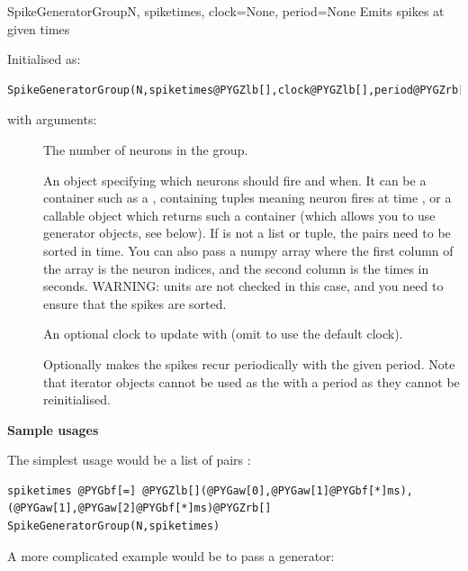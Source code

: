 \documentclass[letterpaper,10pt,english]{manual}
\begin{document}
\hypertarget{brian.SpikeGeneratorGroup}{}\begin{classdesc}{SpikeGeneratorGroup}{N, spiketimes, clock=None, period=None}
Emits spikes at given times

Initialised as:

\begin{Verbatim}[commandchars=@\[\]]
SpikeGeneratorGroup(N,spiketimes@PYGZlb[],clock@PYGZlb[],period@PYGZrb[]@PYGZrb[])
\end{Verbatim}

with arguments:
\begin{description}
\item[]
The number of neurons in the group.

\item[]
An object specifying which neurons should fire and when. It can be a container
such as a , containing tuples  meaning neuron  fires at
time , or a callable object which returns such a container (which
allows you to use generator objects, see below). If  is not
a list or tuple, the pairs  need to be sorted in time. You can
also pass a numpy array  where the first column of the
array is the neuron indices, and the second column is the times in
seconds. WARNING: units are not checked in this case, and you need to
ensure that the spikes are sorted.

\item[]
An optional clock to update with (omit to use the default clock).

\item[]
Optionally makes the spikes recur periodically with the given
period. Note that iterator objects cannot be used as the 
with a period as they cannot be reinitialised.

\end{description}

\textbf{Sample usages}

The simplest usage would be a list of pairs :

\begin{Verbatim}[commandchars=@\[\]]
spiketimes @PYGbf[=] @PYGZlb[](@PYGaw[0],@PYGaw[1]@PYGbf[*]ms), (@PYGaw[1],@PYGaw[2]@PYGbf[*]ms)@PYGZrb[]
SpikeGeneratorGroup(N,spiketimes)
\end{Verbatim}

A more complicated example would be to pass a generator:


\end{classdesc}
\end{document}
